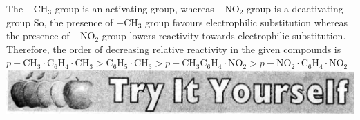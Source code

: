 \documentclass[10pt]{article}
\begin{document}
The $-\mathrm{CH}_{3}$ group is an activating group, whereas $-\mathrm{NO}_{2}$ group is a deactivating group So, the presence of $-\mathrm{CH}_{3}$ group favours electrophilic substitution whereas the presence of $-\mathrm{NO}_{2}$ group lowers reactivity towards electrophilic substitution. Therefore, the order of decreasing relative reactivity in the given compounds is\\
$p-\mathrm{CH}_{3} \cdot \mathrm{C}_{6} \mathrm{H}_{4} \cdot \mathrm{CH}_{3}>\mathrm{C}_{6} \mathrm{H}_{5} \cdot \mathrm{CH}_{3}>p-\mathrm{CH}_{3} \mathrm{C}_{6} \mathrm{H}_{4} \cdot \mathrm{NO}_{2}>p-\mathrm{NO}_{2} \cdot \mathrm{C}_{6} \mathrm{H}_{4} \cdot \mathrm{NO}_{2}$\\
\includegraphics[max width=\textwidth, center]{2025_01_28_8470952b98110cec3aabg-216(1)}
\end{document}
